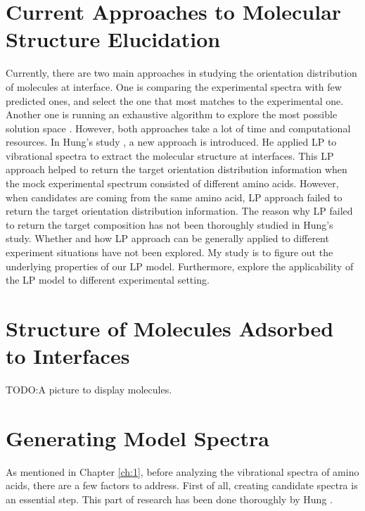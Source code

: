  \label{ch:2}
\section{Current Approaches to Molecular Structure Elucidation}
Currently, there are two main approaches in studying the orientation distribution of molecules at interface. One is comparing the experimental spectra with few predicted ones, and select the one that most matches to the experimental one. Another one is running an exhaustive algorithm to explore the most possible solution space \cite{hore0033-rotations}. However, both approaches take a lot of time and computational resources. In Hung's study \cite{KuoKaiHung:Thesis:2015}, a new approach is introduced. He applied LP to vibrational spectra to extract the molecular structure at interfaces. This LP approach helped to return the target orientation distribution information when the mock experimental spectrum consisted of different amino acids. However, when candidates are coming from the same amino acid, LP approach failed to return the target orientation distribution information. The reason why LP failed to return the target composition has not been thoroughly studied in Hung's study. Whether and how LP approach can be generally applied to different experiment situations have not been explored. My study is to figure out the underlying properties of our LP model. Furthermore, explore the applicability of the LP model to different experimental setting. \\
	
\section{Structure of Molecules Adsorbed to Interfaces}
TODO:A picture to display molecules.


\section{Generating Model Spectra}
As mentioned in Chapter \ref{ch:1}, before analyzing the vibrational spectra of amino acids, there are a few factors to address. First of all, creating candidate spectra is an essential step. This part of research has been done thoroughly by Hung \cite{KuoKaiHung:Thesis:2015}. \\

